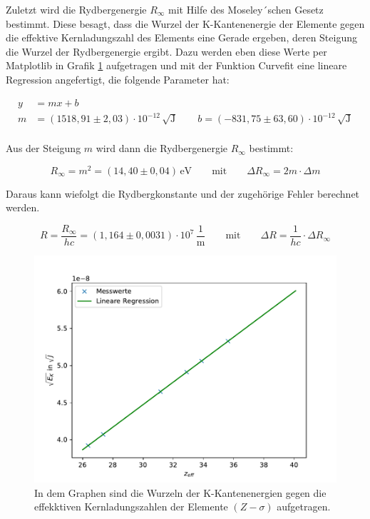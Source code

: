 \documentclass[titlepage = firstcover]{scrartcl}
\begin{document}
            \FloatBarrier
            \noindent
            Zuletzt wird die Rydbergenergie $R_{\infty}$ mit Hilfe des  Moseley´schen Gesetz bestimmt. Diese besagt, dass die Wurzel der K-Kantenenergie der Elemente gegen die effektive 
            Kernladungszahl des Elements eine Gerade ergeben, deren Steigung die Wurzel der Rydbergenergie ergibt. Dazu werden eben diese Werte per Matplotlib in Grafik \ref{fig:Moseley} 
            aufgetragen und mit der Funktion Curvefit eine lineare Regression angefertigt, die folgende Parameter hat:

            \begin{align*}
              y &= mx + b \\
              m &= (1518,91 \pm 2,03) \cdot 10^{-12} \, \sqrt{\text{J}}  \qquad b = (-831,75 \pm 63,60) \cdot 10^{-12} \, \sqrt{\text{J}}\\
            \end{align*}

            \noindent
            Aus der Steigung $m$ wird dann die Rydbergenergie $R_{\infty}$ bestimmt:

            \begin{equation*}
              R_{\infty} = m^2 = (14,40 \pm 0,04) \, \text{eV} \qquad \text{mit} \qquad \Delta R_{\infty} = 2m \cdot \Delta m
            \end{equation*}

            \noindent
            Daraus kann wiefolgt die Rydbergkonstante und der zugehörige Fehler berechnet werden.

            \begin{equation*}
              R = \frac{R_{\infty}}{hc} = (1,164 \pm 0,0031) \cdot 10^{7} \, \frac{1}{\text{m}} \qquad \text{mit} \qquad \Delta R = \frac{1}{hc} \cdot \Delta R_{\infty}
            \end{equation*}
            
            \FloatBarrier
            \begin{figure}[h]
              \centering
              \includegraphics{Moseley.pdf}
              \caption{In dem Graphen sind die Wurzeln der K-Kantenenergien gegen die effekktiven Kernladungszahlen der Elemente $(Z-\sigma)$ aufgetragen.}
              \label{fig:Moseley}
            \end{figure} 
            \FloatBarrier
\end{document}
